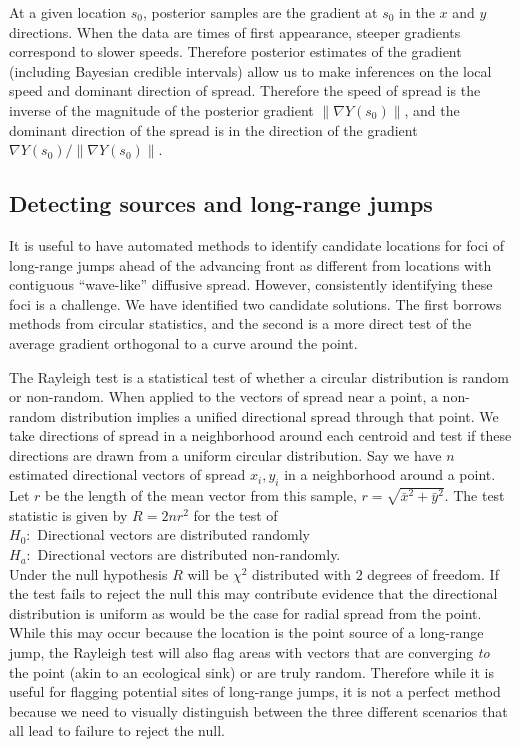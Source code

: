 \documentclass[12pt]{article}
\begin{document}
At a given location $s_0$, posterior samples are the gradient at $s_0$ in the $x$ and $y$ directions. When the data are times of first appearance, steeper gradients correspond to slower speeds. Therefore posterior estimates of the gradient (including Bayesian credible intervals) allow us to make inferences on the local speed and dominant direction of spread. Therefore the speed of spread is the inverse of the magnitude of the posterior gradient $\| \nabla Y(s_0) \|$, and the dominant direction of the spread is in the direction of the gradient $\nabla Y(s_0) / \| \nabla Y(s_0) \|$.


\subsection{Detecting sources and long-range jumps}\label{sec:longrange}

It is useful to have automated methods to identify candidate locations for foci of long-range jumps ahead of the advancing front as different from locations with contiguous ``wave-like'' diffusive spread. However, consistently identifying these foci is a challenge. We have identified two candidate solutions. The first borrows methods from circular statistics, and the second is a more direct test of the average gradient orthogonal to a curve around the point.


The Rayleigh test \citep[see e.g.][]{jammalamadaka2001topics} is a statistical test of whether a circular distribution is random or non-random. When applied to the vectors of spread near a point, a non-random distribution implies a unified directional spread through that point. We take directions of spread in a neighborhood around each centroid and test if these directions are drawn from a uniform circular distribution. Say we have $n$ estimated directional vectors of spread $x_i, y_i$ in a neighborhood around a point. Let $r$ be the length of the mean vector from this sample, $r = \sqrt{\bar{x}^2 + \bar{y}^2}$. The test statistic is given by $R = 2 nr^2$ for the test of \\
\indent $H_0:$ Directional vectors are distributed randomly \\
\indent $H_a:$ Directional vectors are distributed non-randomly. \\
Under the null hypothesis $R$ will be $\chi^2$ distributed with $2$ degrees of freedom. If the test fails to reject the null this may contribute evidence that the directional distribution is uniform as would be the case for radial spread from the point. While this may occur because the location is the point source of a long-range jump, the Rayleigh test will also flag areas with vectors that are converging {\it to} the point (akin to an ecological sink) or are truly random. Therefore while it is useful for flagging potential sites of long-range jumps, it is not a perfect method because we need to visually distinguish between the three different scenarios that all lead to failure to reject the null.
\end{document}
